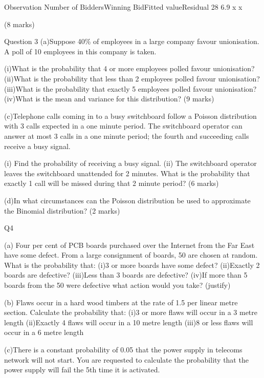 			
			Observation    Number of BiddersWinning BidFitted valueResidual
			28        6.9       x      x
			
			(8 marks)
			
			
			
			
			Question 3
			(a)Suppose 40\% of employees in a large company favour unionisation.  A poll of 10 employees in this company is taken.  
			
			(i)What is the probability that 4 or more employees polled favour unionisation? 
			(ii)What is the probability that less than 2 employees polled favour unionisation?
			(iii)What is the probability that exactly 5 employees polled favour unionisation?
			(iv)What is the mean and variance for this distribution?
			(9 marks)
			
			
			
			(c)Telephone calls coming in to a busy switchboard follow a Poisson distribution with 3 calls expected in a one minute period.  The switchboard operator can answer at most 3 calls in a one minute period; the fourth and succeeding calls receive a busy signal.
			
			(i)   Find the probability of receiving a busy signal.
			(ii)   The switchboard operator leaves the switchboard unattended for 2 minutes.  What is the probability that exactly 1 call will be missed during that 2 minute period?
			(6 marks)
			
			(d)In what circumstances can the Poisson distribution be used to approximate the Binomial distribution?
			(2 marks)
			
			
			Q4
			
			
			(a)  Four  per cent of PCB boards purchased over the Internet from the Far East have some defect.  From a large consignment of boards, 50 are chosen at random.  What is the probability that:
			(i)3 or more boards have some defect?
			(ii)Exactly 2 boards are defective?
			(iii)Less than 3 boards are defective?
			(iv)If more than 5 boards from the 50 were defective what action would you take? (justify)
			
			(b) Flaws occur in a hard wood timbers  at the rate of 1.5 per linear  metre section.  Calculate the probability that:
			(i)3 or more flaws will occur in a 3  metre length 
			(ii)Exactly 4 flaws will occur in a 10 metre length
			(iii)8 or less flaws will occur in a 6  metre length 
			
			(c)There is a constant probability of 0.05  that the power supply in telecoms network will not start.  You are requested to calculate the probability that the power supply will fail the 5th time it is activated.
			
			\newpage
			
